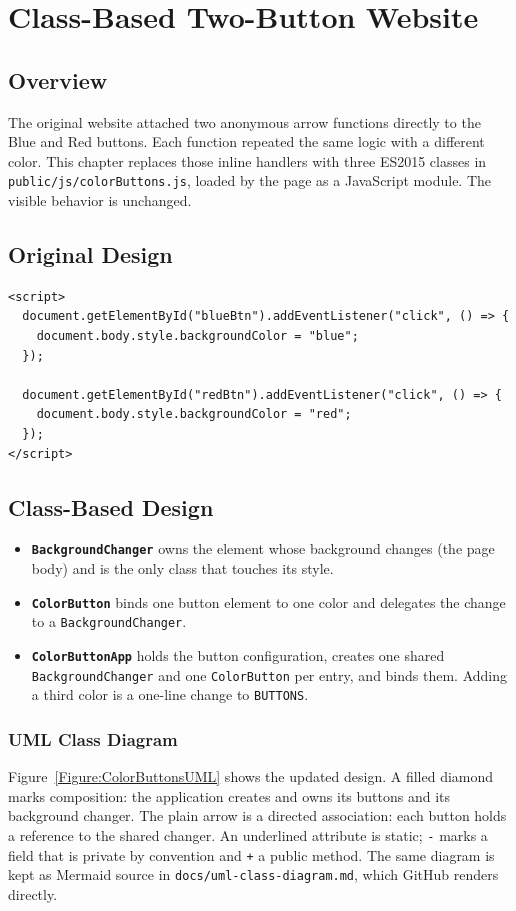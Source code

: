 \chapter{Class-Based Two-Button Website}

\section{Overview}
The original website attached two anonymous arrow functions directly to the
Blue and Red buttons. Each function repeated the same logic with a different
color. This chapter replaces those inline handlers with three ES2015 classes in
\texttt{public/js/colorButtons.js}, loaded by the page as a JavaScript module.
The visible behavior is unchanged.

\section{Original Design}
\begin{verbatim}
<script>
  document.getElementById("blueBtn").addEventListener("click", () => {
    document.body.style.backgroundColor = "blue";
  });

  document.getElementById("redBtn").addEventListener("click", () => {
    document.body.style.backgroundColor = "red";
  });
</script>
\end{verbatim}

\section{Class-Based Design}
\begin{itemize}
\item \textbf{\texttt{BackgroundChanger}} owns the element whose background
changes (the page body) and is the only class that touches its style.
\item \textbf{\texttt{ColorButton}} binds one button element to one color and
delegates the change to a \texttt{BackgroundChanger}.
\item \textbf{\texttt{ColorButtonApp}} holds the button configuration,
creates
one shared \texttt{BackgroundChanger} and one \texttt{ColorButton} per entry,
and binds them. Adding a third color is a one-line change to
\texttt{BUTTONS}.
\end{itemize}

\subsection{UML Class Diagram}
Figure~\ref{Figure:ColorButtonsUML} shows the updated design. A filled diamond
marks composition: the application creates and owns its buttons and its
background changer. The plain arrow is a directed association: each button
holds a reference to the shared changer. An underlined attribute is static;
\texttt{-} marks a field that is private by convention and \texttt{+} a public
method. The same diagram is kept as Mermaid
source in \texttt{docs/uml-class-diagram.md}, which GitHub renders directly.


